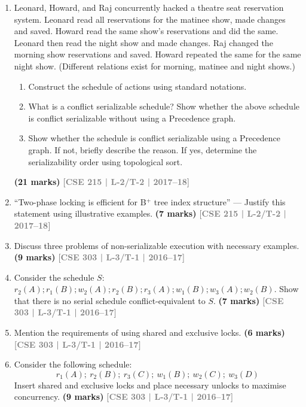 \documentclass[12pt,a3paper]{article}
\newcommand{\yr}[1]{\hfill\textcolor{gray}{\small\textbf{[#1]}}}
\newcommand{\mk}[1]{\textcolor{orange!70!black}{\small\textbf{(#1 marks)}}}
\begin{document}
\begin{enumerate}
\item Leonard, Howard, and Raj concurrently hacked a theatre seat reservation system. Leonard read all reservations for the matinee show, made changes and saved. Howard read the same show's reservations and did the same. Leonard then read the night show and made changes. Raj changed the morning show reservations and saved. Howard repeated the same for the same night show. (Different relations exist for morning, matinee and night shows.)
\begin{enumerate}
  \item Construct the schedule of actions using standard notations.
  \item What is a conflict serializable schedule? Show whether the above schedule is conflict serializable without using a Precedence graph.
  \item Show whether the schedule is conflict serializable using a Precedence graph. If not, briefly describe the reason. If yes, determine the serializability order using topological sort.
\end{enumerate}
  \mk{21} \yr{CSE 215 | L-2/T-2 | 2017--18}

\item ``Two-phase locking is efficient for B$^+$ tree index structure'' --- Justify this statement using illustrative examples.
\mk{7} \yr{CSE 215 | L-2/T-2 | 2017--18}

\item Discuss three problems of non-serializable execution with necessary examples.
\mk{9} \yr{CSE 303 | L-3/T-1 | 2016--17}

\item Consider the schedule $S$: $r_2(A); r_1(B); w_2(A); r_2(B); r_3(A); w_1(B); w_3(A); w_2(B)$. Show that there is no serial schedule conflict-equivalent to $S$.
\mk{7} \yr{CSE 303 | L-3/T-1 | 2016--17}

\item Mention the requirements of using shared and exclusive locks.
\mk{6} \yr{CSE 303 | L-3/T-1 | 2016--17}

\item Consider the following schedule:
\[r_1(A);\ r_2(B);\ r_3(C);\ w_1(B);\ w_2(C);\ w_3(D)\]
Insert shared and exclusive locks and place necessary unlocks to maximise concurrency.
  \mk{9} \yr{CSE 303 | L-3/T-1 | 2016--17}


\end{enumerate}
\end{document}
